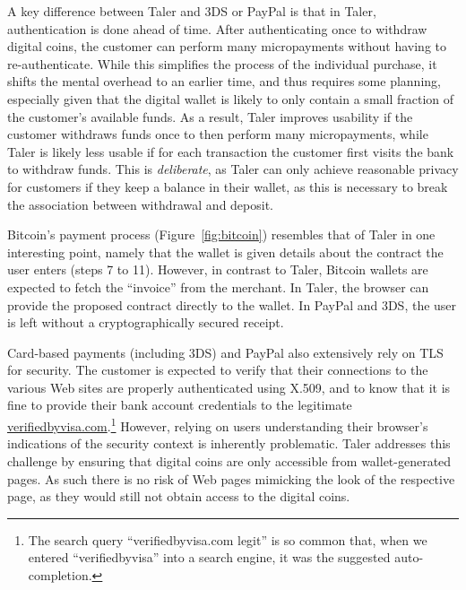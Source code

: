 \documentclass{llncs}
\begin{document}
A key difference between Taler and 3DS or PayPal is that
in Taler, authentication is done ahead of time.
After authenticating once to withdraw digital coins, the customer can
perform many micropayments without having to re-authenticate.  While
this simplifies the process of the individual purchase, it shifts the
mental overhead to an earlier time, and thus requires some planning,
especially given that the digital wallet is likely to only contain a
small fraction of the customer's available funds.  As a result, Taler
improves usability if the customer withdraws funds once to
then perform many micropayments, while Taler is likely less usable
if for each transaction the customer first visits the bank to withdraw
funds.  This is {\em deliberate}, as Taler can only achieve reasonable
privacy for customers if they keep a balance in their wallet, as
this is necessary to break the association between withdrawal and deposit.

Bitcoin's payment process (Figure~\ref{fig:bitcoin}) resembles that of
Taler in one interesting point, namely that the wallet is given
details about the contract the user enters (steps 7 to 11).
However, in contrast to Taler, Bitcoin wallets are expected
to fetch the ``invoice'' from the merchant. In Taler, the browser
can provide the proposed contract directly to the wallet.  In
PayPal and 3DS, the user is left without a cryptographically secured
receipt.

Card-based payments (including 3DS) and PayPal also extensively rely
on TLS for security.  The customer is expected to verify that their
connections to the various Web sites are properly authenticated using
X.509, and to know that it is fine to provide their bank account
credentials to the legitimate
\url{verifiedbyvisa.com}.\footnote{The search query
``verifiedbyvisa.com legit'' is so common that, when we entered
``verifiedbyvisa'' into a search engine, it was the suggested
auto-completion.}  However, relying on users understanding their
browser's indications of the security context is inherently
problematic.  Taler addresses this challenge by ensuring that digital
coins are only accessible from wallet-generated pages. As such
there is no risk of Web pages mimicking the look of the respective
page, as they would still not obtain access to the digital coins.
\end{document}
